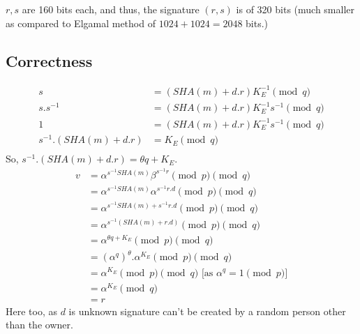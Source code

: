 \documentclass[english, 11pt]{article}
\begin{document}
\begin{figure}[ht]
\begin{tikzpicture}

\end{tikzpicture}

\centering   
\end{figure}
$r,s$ are 160 bits each, and thus, the signature $(r,s)$ is of 320 bits (much smaller as compared to Elgamal method of $1024 + 1024 = 2048$ bits.)
\subsection*{Correctness}

\begin{align*}
  s &= (SHA(m)+d.r) K_{E}^{-1} \pmod{q} \\
  s.s^{-1}&= (SHA(m)+d.r) K_{E}^{-1} s^{-1} \pmod{q} \\
  1 &= (SHA(m)+d.r) K_{E}^{-1} s^{-1} \pmod{q} \\
  s^{-1}.(SHA(m)+d.r) &= K_E \pmod{q} \\
\end{align*}
So, $s^{-1}.(SHA(m)+d.r) = \theta q + K_E$.
\begin{align*}
  v &= \alpha^{s^{-1}SHA(m)} \beta^{s^{-1}r} \pmod{p} \pmod{q}\\
  &= \alpha^{s^{-1}SHA(m)} \alpha^{s^{-1}r.d} \pmod{p} \pmod{q}\\
  &= \alpha^{s^{-1}SHA(m)+s^{-1}r.d} \pmod{p} \pmod{q}\\
  &= \alpha^{s^{-1}(SHA(m)+r.d)} \pmod{p} \pmod{q}\\
  &= \alpha^{\theta q + K_E} \pmod{p} \pmod{q}\\
  &= (\alpha^{q})^{\theta}.\alpha^{K_E} \pmod{p} \pmod{q}\\
  &= \alpha^{K_E} \pmod{p} \pmod{q} \text{     [as $\alpha^q = 1 \pmod{p}$]}\\
  &= \alpha^{K_E} \pmod{q} \\
  &= r
\end{align*}
Here too, as $d$ is unknown signature can't be created by a random person other than the owner.
\end{document}
